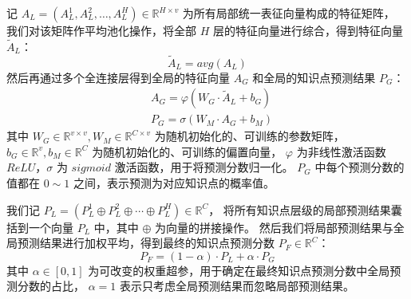     记 $A_L = \left(A_L^1, A_L^2, \dots, A_L^H\right) \in \mathbb{R}^{H \times v}$ 为所有局部统一表征向量构成的特征矩阵，
    我们对该矩阵作平均池化操作，将全部 $H$ 层的特征向量进行综合，得到特征向量 $\tilde{A}_L$：
    \begin{equation}
        \tilde{A}_L = avg\left(A_L\right)
    \end{equation}
    然后再通过多个全连接层得到全局的特征向量 $A_G$ 和全局的知识点预测结果 $P_G$：
    \begin{equation}
        \begin{aligned}
            &A_G = \varphi\left(W_G \cdot \tilde{A}_L + b_G\right) \\
            &P_G = \sigma\left(W_M \cdot A_G + b_M\right)
        \end{aligned}
    \end{equation}
    其中 $W_G \in \mathbb{R}^{v \times v}, W_M \in \mathbb{R}^{C \times v}$ 为随机初始化的、可训练的参数矩阵，
    $b_G \in \mathbb{R}^{v}, b_M \in \mathbb{R}^{C}$ 为随机初始化的、可训练的偏置向量，
    $\varphi$ 为非线性激活函数 $ReLU$，$\sigma$ 为 $sigmoid$ 激活函数，用于将预测分数归一化。
    $P_G$ 中每个预测分数的值都在 $0 \sim 1$ 之间，表示预测为对应知识点的概率值。

    我们记 $P_L = \left(P_L^1 \oplus P_L^2 \oplus \cdots \oplus P_L^H\right) \in \mathbb{R}^{C}$，
    将所有知识点层级的局部预测结果囊括到一个向量 $P_L$ 中，其中 $\oplus$ 为向量的拼接操作。
    然后我们将局部预测结果与全局预测结果进行加权平均，得到最终的知识点预测分数 $P_F \in \mathbb{R}^{C}$：
    \begin{equation}
        P_F = (1 - \alpha) \cdot P_L + \alpha \cdot P_G
    \end{equation}
    其中 $\alpha \in [0, 1]$ 为可改变的权重超参，用于确定在最终知识点预测分数中全局预测分数的占比，
    $\alpha = 1$ 表示只考虑全局预测结果而忽略局部预测结果。

